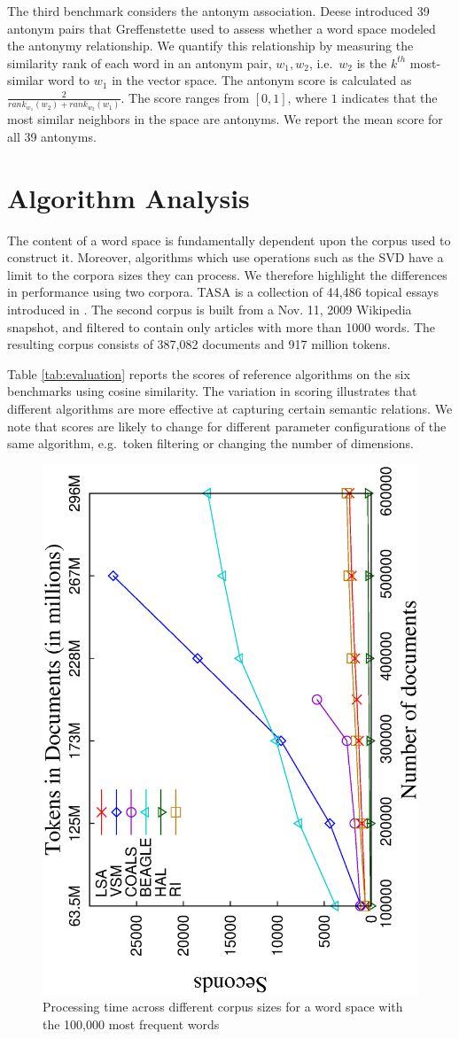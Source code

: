 The third benchmark considers the antonym association.  Deese
 introduced 39 antonym pairs that Greffenstette
 used to assess whether a word space modeled
the antonymy relationship.  We quantify this relationship by measuring the
similarity rank of each word in an antonym pair, $w_1,w_2$, i.e.\  $w_2$ is the
$k^{th}$ most-similar word to $w_1$ in the vector space.  The antonym score is
calculated as $\frac{2}{rank_{w_1}(w_2) + rank_{w_2}(w_1)}$.  The score ranges
from $[0,1]$, where $1$ indicates that the most similar neighbors in the space are
antonyms.  We report the mean score for all 39 antonyms.

\section{Algorithm Analysis}

The content of a word space is fundamentally dependent upon the corpus used to
construct it.  Moreover, algorithms which use operations such as the SVD have a
limit to the corpora sizes they can process.  We therefore highlight the
differences in performance using two corpora.  TASA is a collection of 44,486
topical essays introduced in \cite{landauer97solution}.  The second corpus is
built from a Nov. 11, 2009 Wikipedia snapshot, and filtered to contain only
articles with more than 1000 words.  The resulting corpus consists of
387,082 documents and 917 million tokens.

Table \ref{tab:evaluation} reports the scores of reference algorithms on the six
benchmarks using cosine similarity.  The variation in scoring illustrates that
different algorithms are more effective at capturing certain semantic relations.
We note that scores are likely to change for different parameter configurations
of the same algorithm, e.g.\ token filtering or changing the number of
dimensions.

\begin{figure}[tb]
  \center
  \includegraphics[angle=270,width=.46\textwidth]{figures/timing.eps} 
  \caption{Processing time across different corpus sizes for a word space with
    the 100,000 most frequent words}
  \label{fig:sspace_timing} 
\end{figure}

